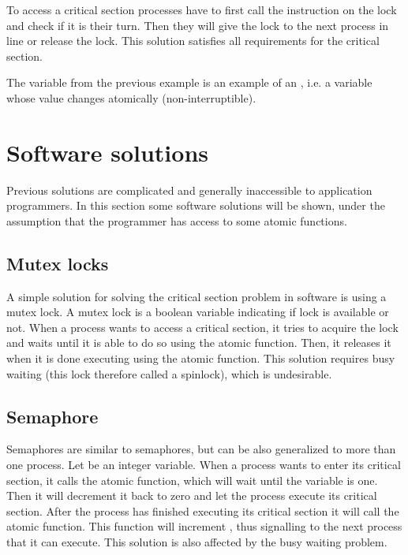 To access a critical section processes have to first call the  instruction on the lock and check if it is their turn. Then they will give the lock to the next process in line or release the lock. 
This solution satisfies all requirements for the critical section.

The  variable from the previous example is an example of an , i.e. a variable whose value changes atomically (non-interruptible).

\section{Software solutions}
Previous solutions are complicated and generally inaccessible to application programmers. In this section some software solutions will be shown, under the assumption that the programmer has access to some atomic functions.

\subsection{Mutex locks}
A simple solution for solving the critical section problem in software is using a mutex lock. A mutex lock is a boolean variable indicating if lock is available or not. When a process wants to access a critical section, it tries to acquire the lock and waits until it is able to do so using the  atomic function. Then, it releases it when it is done executing using the  atomic function. This solution requires busy waiting (this lock therefore called a spinlock), which is undesirable.

\subsection{Semaphore}
Semaphores are similar to semaphores, but can be also generalized to more than one process. Let  be an integer variable. When a process wants to enter its critical section, it calls the  atomic function, which will wait until the  variable is one. Then it will decrement it back to zero and let the process execute its critical section. After the process has finished executing its critical section it will call the  atomic function. This function will increment , thus signalling to the next process that it can execute. This solution is also affected by the busy waiting problem.

